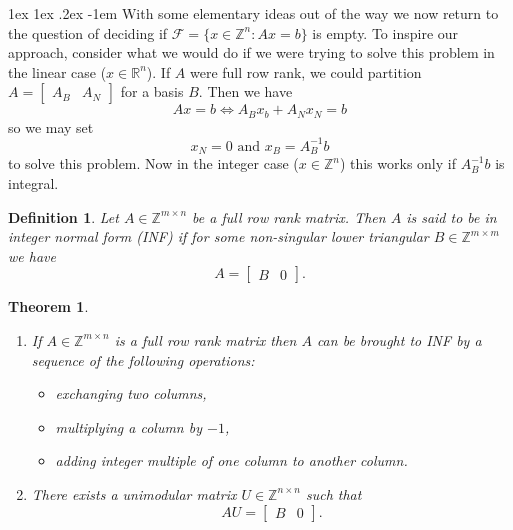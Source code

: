 \documentclass[11pt]{article}
\makeatletter
\renewcommand\paragraph{\@startsection{paragraph}{4}{0mm}%
                                    {1ex \@plus1ex \@minus.2ex}%
                                    {-1em}%
                                    {\normalfont\normalsize\bfseries}}
\newtheorem{theorem}[fact]{Theorem}
\newtheorem{definition}[fact]{Definition}
\newcommand{\R}{\ensuremath{\mathbb R}}
\newcommand{\Z}{\ensuremath{\mathbb Z}}
\makeatother
\begin{document}
\paragraph{}
With some elementary ideas out of the way we now return to the question of deciding if $\mathcal{F} = \{x \in \Z^n : Ax = b\}$ is empty. To inspire our approach, consider what we would do if we were trying to solve this problem in the linear case ($x \in \R^n$). If $A$ were full row rank, we could partition $A = \begin{bmatrix} A_B & A_N \end{bmatrix}$ for a basis $B$. Then we have
$$
Ax = b \iff A_Bx_b + A_N x_N = b
$$
so we may set 
$$ x_N = 0 \text{ and } x_B = A_B^{-1}b $$
to solve this problem. Now in the integer case ($x \in \Z^n$) this works only if $A_B^{-1}b$ is integral.
\begin{definition}
Let $A \in \Z^{m \times n}$ be a full row rank matrix. Then $A$ is said to be in integer normal form (INF) if for some non-singular lower triangular $B \in \Z^{m \times m}$ we have
$$ A = \begin{bmatrix} B & 0 \end{bmatrix}.$$
\end{definition}
\begin{theorem}
\begin{enumerate}
\item If $A \in \Z^{m \times n}$ is a full row rank matrix then $A$ can be brought to INF by a sequence of the following operations:
\begin{itemize}
\item exchanging two columns,
\item multiplying a column by $-1$,
\item adding integer multiple of one column to another column.
\end{itemize}
\item There exists a unimodular matrix $U \in \Z^{n \times n}$ such that $$AU = \begin{bmatrix} B & 0 \end{bmatrix}.$$
\end{enumerate}
\end{theorem}
\end{document}
